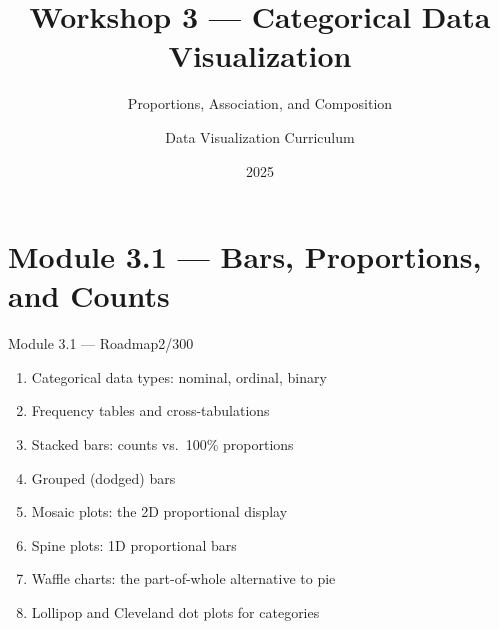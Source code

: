 \documentclass[10pt]{beamer}
\title{Workshop 3 --- Categorical Data Visualization}
\subtitle{Proportions, Association, and Composition}
\author{Data Visualization Curriculum}
\date{2025}
\institute{Comparative R \& Python Approach}
\newcommand{\smark}[1]{\hfill{\scriptsize\color{codegray}#1}}
\begin{document}
\maketitle

\section{Module 3.1 --- Bars, Proportions, and Counts}

\begin{frame}{Module 3.1 --- Roadmap}\smark{2/300}
\begin{enumerate}
    \item Categorical data types: nominal, ordinal, binary
    \item Frequency tables and cross-tabulations
    \item Stacked bars: counts vs.\ 100\% proportions
    \item Grouped (dodged) bars
    \item Mosaic plots: the 2D proportional display
    \item Spine plots: 1D proportional bars
    \item Waffle charts: the part-of-whole alternative to pie
    \item Lollipop and Cleveland dot plots for categories
\end{enumerate}
\end{frame}
\end{document}
